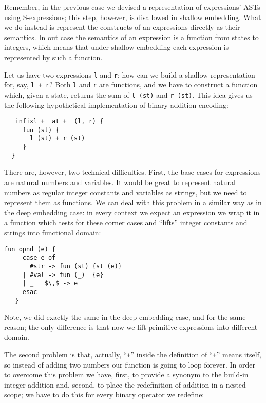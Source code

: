 Remember, in the previous case we devised a representation of expressions' ASTs using S-expressions; this step, however, is
disallowed in shallow embedding. What we do instead is represent the constructs of an expressions directly as their
semantics. In out case the semantics of an expression is a function from states to integers, which means that under
shallow embedding each expression is represented by such a function.

Let us have two expressions \lstinline|l| and \lstinline|r|; how can we build a shallow representation for, say, \lstinline|l + r|?
Both \lstinline|l| and \lstinline|r| are functions, and we have to construct a function which, given a state, returns
the sum of \lstinline|l (st)| and \lstinline|r (st)|. This idea gives us the following hypothetical implementation of
binary addition encoding:

\begin{lstlisting}
   infixl +  at +  (l, r) {
     fun (st) {
       l (st) + r (st)
     }
  }
\end{lstlisting}

There are, however, two technical difficulties. First, the base cases for expressions are natural numbers and variables. It would be
great to represent natural numbers as regular integer constants and variables as strings, but we need to represent them as functions.
We can deal with this problem in a similar way as in the deep embedding case: in every context we expect an expression we wrap it in a function
which tests for these corner cases and ``lifts'' integer constants and strings into functional domain:

\begin{lstlisting}[mathescape=true]
   fun opnd (e) {
     case e of
       #str -> fun (st) {st (e)}
     | #val -> fun (_)  {e}
     | _   $\,$ -> e
     esac
   }
\end{lstlisting}

Note, we did exactly the same in the deep embedding case, and for the same reason; the only difference is that now we lift
primitive expressions into different domain.

The second problem is that, actually, ``\lstinline|+|'' inside the definition of ``\lstinline|+|'' means itself, so instead
of adding two numbers our function is going to loop forever. In order to overcome this problem we have, first, to provide a
synonym to the build-in integer addition and, second, to place the redefinition of addition in a nested scope; we have to do this
for every binary operator we redefine:

